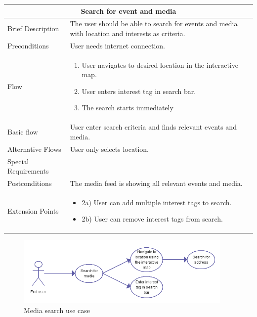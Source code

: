 \begin{minipage}{\linewidth}
\begin{tabular}{|l|p{85mm}|}
  \hline
  \multicolumn{2}{|c|}{\cellcolor{gray!25} \textbf{Search for event and media}} \\
  \hline
  Brief Description & The user should be able to search for events and media with location and interests as criteria.\\
  Preconditions & User needs internet connection.\\
  Flow &
    \begin{enumerate}
      \item User navigates to desired location in the interactive map.
      \item User enters interest tag in search bar.
      \item The search starts immediately
    \end{enumerate} \\
  Basic flow & User enter search criteria and finds relevant events and media. \\
  Alternative Flows & User only selects location.\\
  Special Requirements & \\
  Postconditions & The media feed is showing all relevant events and media. \\
  Extension Points & 
    \begin{itemize}
      \item 2a) User can add multiple interest tags to search. 
      \item 2b) User can remove interest tags from search. 
    \end{itemize} \\
  \hline
\end{tabular}
\end{minipage}

\begin{figure}[ht!]
\centering
\includegraphics[width=105mm]{./SystemRequirements/img/searchUC.png}
\caption{Media search use case \label{fig:SysReqUseCasesSearch}}
\end{figure}

